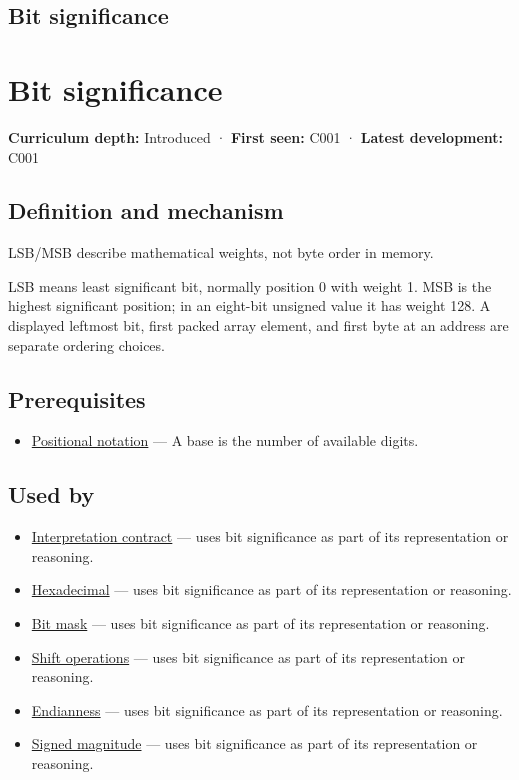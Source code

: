 \hypertarget{appendix-280445746493}{}
\section*{Bit significance}
\chapter{Bit significance}\label{appendix-280445746493-bit-significance}

\textbf{Curriculum depth:} Introduced · \textbf{First seen:} C001 · \textbf{Latest development:} C001

\section{Definition and mechanism}\label{appendix-280445746493-definition-and-mechanism}

LSB/MSB describe mathematical weights, not byte order in memory.

LSB means least significant bit, normally position 0 with weight 1. MSB is the highest significant position; in an eight-bit unsigned value it has weight 128. A displayed leftmost bit, first packed array element, and first byte at an address are separate ordering choices.

\section{Prerequisites}\label{appendix-280445746493-prerequisites}

\begin{itemize}
\tightlist
\item
  \hyperref[appendix-83c3f28f7bda]{Positional notation} --- A base is the number of available digits.
\end{itemize}

\section{Used by}\label{appendix-280445746493-used-by}

\begin{itemize}
\tightlist
\item
  \hyperref[appendix-f414bd4ed05c]{Interpretation contract} --- uses bit significance as part of its representation or reasoning.
\item
  \hyperref[appendix-6b8075763724]{Hexadecimal} --- uses bit significance as part of its representation or reasoning.
\item
  \hyperref[appendix-dbe5905163c2]{Bit mask} --- uses bit significance as part of its representation or reasoning.
\item
  \hyperref[appendix-73425b25118e]{Shift operations} --- uses bit significance as part of its representation or reasoning.
\item
  \hyperref[appendix-bc07c3d25b18]{Endianness} --- uses bit significance as part of its representation or reasoning.
\item
  \hyperref[appendix-ce20506c8532]{Signed magnitude} --- uses bit significance as part of its representation or reasoning.
\end{itemize}

